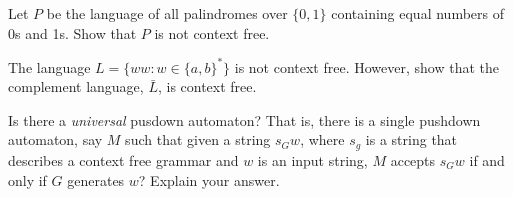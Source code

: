\documentclass[12pt]{exam}
\begin{document}
\begin{questions}
  \question{}
  Let $P$ be the language of all palindromes over $\{0,1\}$ containing equal numbers of 0s and 1s. Show that $P$ is not context free.


  \question{}
  The language $L=\{ww: w\in \{a,b\}^{*}\}$ is not context free. However, show that the complement language, $\bar{L}$, is context free.

  \question{}
  Is there a \emph{universal} pusdown automaton? That is, there is a single pushdown automaton, say $M$ such that given a string $s_{G}w$, where $s_{g}$ is a string that describes a context free grammar and $w$ is an input string, $M$ accepts $s_{G}w$ if and only if $G$ generates $w$? Explain your answer.
\end{questions}
\end{document}
